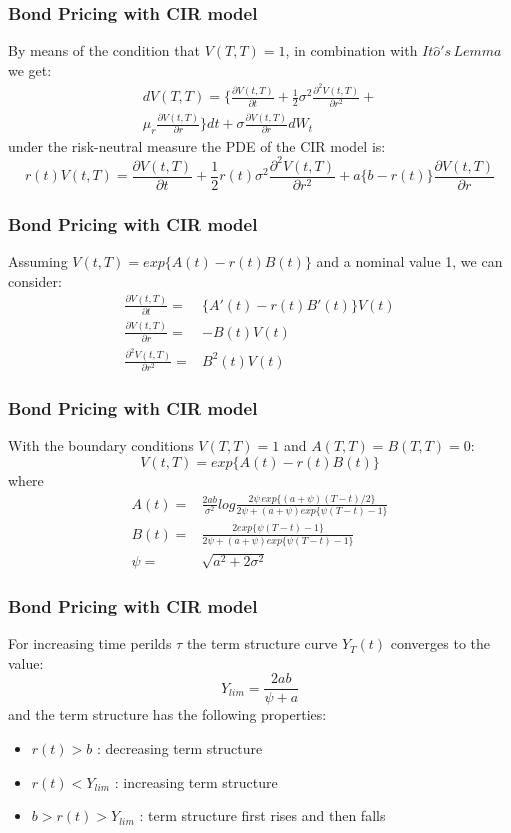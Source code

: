 \documentclass[11pt]{beamer}
\begin{document}
	\begin{frame}
		\frametitle{Bond Pricing with CIR model}
		By means of the condition that $ V(T,T)=1 $, in combination with $ It\hat{o}'s  \,Lemma $ we get:
		\begin{multline}
		dV(T,T)=\{\frac{\partial V(t,T)}{\partial t}+\frac{1}{2}\sigma^2\frac{\partial^2V(t,T)}{\partial r^2}+ \\
                \mu_r\frac{\partial V(t,T)}{\partial r}\}dt+\sigma\frac{\partial V(t,T)}{\partial r}dW_t
		\end{multline}
		under the risk-neutral measure the PDE of the CIR model is:
		\begin{equation}
		r(t)V(t,T)= \frac{\partial V(t,T)}{\partial t} + \frac{1}{2}r(t)\sigma^2\frac{\partial^2 V(t,T)}{\partial r^2}+ a\{b-r(t)\}\frac{\partial V(t,T)}{\partial r}
        \end{equation}
	\end{frame}
	
	\begin{frame}
		\frametitle{Bond Pricing with CIR model}
		Assuming $ V(t,T)=exp\{A(t)-r(t)B(t)\} $ and a nominal value 1, we can consider:
		\begin{align*}
		\frac{\partial V(t,T)}{\partial t}=& \{A'(t)-r(t)B'(t)\}V(t) \\
		\frac{\partial V(t,T)}{\partial r}=& -B(t)V(t) \\
		\frac{\partial^2 V(t,T)}{\partial r^2}=& B^2(t)V(t)
		\end{align*}
	\end{frame}
	
	\begin{frame}
		\frametitle{Bond Pricing with CIR model}
		With the boundary conditions $ V(T,T)=1 $ and $ A(T,T)=B(T,T)=0 $:
		\[
		V(t,T)=exp\{A(t)-r(t)B(t)\}
		\]
		where
		\begin{align*}
		A(t)=& \frac{2ab}{\sigma^2}log\frac{2\psi \,exp\{(a+\psi)(T-t)/2\}}{2\psi+(a+\psi)exp\{\psi(T-t)-1\}} \\
		B(t)=& \frac{2exp\{\psi(T-t)-1\}}{2\psi+(a+\psi)exp\{\psi(T-t)-1\}} \\
		\psi=& \sqrt{a^2+2\sigma^2}
		\end{align*}
	\end{frame}
	
	
	\begin{frame}
		\frametitle{Bond Pricing with CIR model}
		For increasing time perilds $ \tau $ the term structure curve $ Y_T(t) $ converges to the value:
		\[
		Y_{lim}=\frac{2ab}{\psi+a}
		\]
		and the term structure has the following properties:
		\begin{itemize}
			\item $ r(t)>b $ : decreasing term structure
			\item $ r(t)<Y_{lim} $ : increasing term structure
			\item $ b>r(t)>Y_{lim} $ : term structure first rises and then falls
		\end{itemize}
	\end{frame}
	
\end{document}
